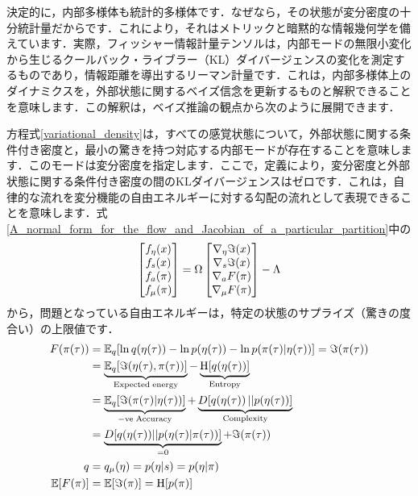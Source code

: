 \documentclass[a4paper, titlepage]{jsarticle}
\begin{document}
決定的に，内部多様体も統計的多様体です．なぜなら，その状態が変分密度の十分統計量だからです．これにより，それはメトリックと暗黙的な情報幾何学を備えています．実際，フィッシャー情報計量テンソルは，内部モードの無限小変化から生じるクールバック・ライブラー（KL）ダイバージェンスの変化を測定するものであり，情報距離を導出するリーマン計量です．これは，内部多様体上のダイナミクスを，外部状態に関するベイズ信念を更新するものと解釈できることを意味します．この解釈は，ベイズ推論の観点から次のように展開できます．
\par
方程式\eqref{variational_density}は，すべての感覚状態について，外部状態に関する条件付き密度と，最小の驚きを持つ対応する内部モードが存在することを意味します．このモードは変分密度を指定します．ここで，定義により，変分密度と外部状態に関する条件付き密度の間のKLダイバージェンスはゼロです．これは，自律的な流れを変分機能の自由エネルギーに対する勾配の流れとして表現できることを意味します．式\eqref{A_normal_form_for_the_flow_and_Jacobian_of_a_particular_partition}中の
\begin{equation}\label{from_A_normal_form_for_the_flow_and_Jacobian_of_a_particular_partition}
    \begin{bmatrix}
        f_{\eta}(x) \\
        f_{s}(x) \\
        f_{a}(\pi) \\
        f_{\mu}(\pi)
    \end{bmatrix}
    =\Omega\begin{bmatrix}
        \nabla_{\eta}\imaginary(x) \\
        \nabla_{s}\imaginary(x) \\
        \nabla_{a}F(\pi) \\
        \nabla_{\mu}F(\pi)
    \end{bmatrix}-\Lambda
\end{equation}
から，問題となっている自由エネルギーは，特定の状態のサプライズ（驚きの度合い）の上限値です．
\begin{equation}
    \begin{aligned}
        F(\pi(\tau)) &= \mathbb{E}_q[\ln q(\eta(\tau)) - \ln p(\eta(\tau)) - \ln p(\pi(\tau) | \eta(\tau))]=\imaginary(\pi(\tau)) \\
        &=\underbrace{\mathbb{E}_q\qty[\imaginary\qty(\eta(\tau),\pi(\tau))]}_{\mathrm{Expected\;energy}}-\underbrace{\mathrm{H}\qty[q\qty(\eta(\tau))]}_{\mathrm{Entropy}} \\
        &=\underbrace{\mathbb{E}_q\qty[\imaginary\qty(\pi(\tau)|\eta(\tau))]}_{\mathrm{-ve\;Accuracy}}+\underbrace{D\qty[q\qty(\eta(\tau))||p\qty(\eta(\tau))]}_\mathrm{Complexity} \\
        &=\underbrace{D[q(\eta(\tau)) || p(\eta(\tau) | \pi(\tau))]}_{=0} + \imaginary(\pi(\tau)) \\
        q&=q_{\mu}(\eta) = p(\eta | s) = p(\eta | \pi) \\
        \mathbb{E}[F(\pi)] &= \mathbb{E}[\imaginary(\pi)] = \mathrm{H}[p(\pi)]
    \end{aligned}
\end{equation}
\end{document}
